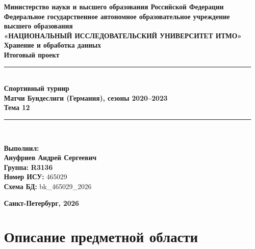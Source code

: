 \documentclass[14pt,a4paper]{extarticle}
\begin{document}
\begin{titlepage}
  \begin{center}
    \textbf{Министерство науки и высшего образования Российской Федерации}\\[0.3cm]
    \textbf{Федеральное государственное автономное образовательное учреждение\\
    высшего образования}\\[0.3cm]
    \textbf{«НАЦИОНАЛЬНЫЙ ИССЛЕДОВАТЕЛЬСКИЙ УНИВЕРСИТЕТ ИТМО»}\\[2cm]

    \textbf{\Large Хранение и обработка данных}\\[0.5cm]
    \textbf{\large Итоговый проект}\\[1cm]

    \rule{\linewidth}{0.5pt}\\[0.3cm]
    \textbf{\LARGE Спортивный турнир}\\[0.2cm]
    \textbf{\large Матчи Бундеслиги (Германия), сезоны 2020--2023}\\[0.2cm]
    \textbf{Тема 12}\\[0.3cm]
    \rule{\linewidth}{0.5pt}\\[2cm]

    \begin{flushleft}
      \hspace{7cm}
      \begin{minipage}{8cm}
        \textbf{Выполнил:}\\
        \textbf{Ануфриев Андрей Сергеевич}\\[0.3cm]
        \textbf{Группа:} \textbf{R3136}\\[0.3cm]
        \textbf{Номер ИСУ:} 465029\\[0.3cm]
        \textbf{Схема БД:} bk\_465029\_2026\\[0.3cm]

      \end{minipage}
    \end{flushleft}

    \vfill
    \textbf{Санкт-Петербург, 2026}
  \end{center}
\end{titlepage}

\tableofcontents
\newpage

\section{Описание предметной области}
\end{document}
